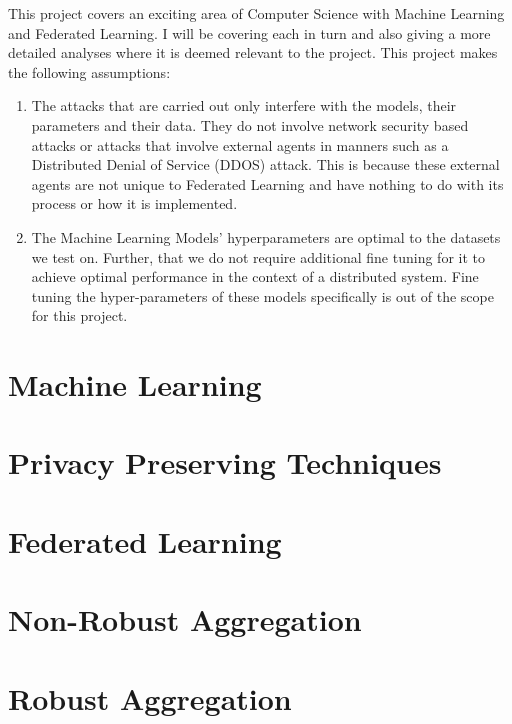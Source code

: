 This project covers an exciting area of Computer Science with Machine Learning and Federated Learning.
I will be covering each in turn and also giving a more detailed analyses where it is deemed relevant to the project.
This project makes the following assumptions:

\begin{enumerate}
    \item The attacks that are carried out only interfere with the models, their parameters and their data. They do not involve network security based attacks or attacks that involve external agents in manners such as a Distributed Denial of Service (DDOS) attack.
    This is because these external agents are not unique to Federated Learning and have nothing to do with its process or how it is implemented.
    
    \item The Machine Learning Models' hyperparameters are optimal to the datasets we test on. Further, that we do not require additional fine tuning for it to achieve optimal performance in the context of a distributed system. Fine tuning the hyper-parameters of these models specifically is out of the scope for this project.
\end{enumerate}


\section{Machine Learning}




\section{Privacy Preserving Techniques}




\section{Federated Learning}




\section{Non-Robust Aggregation}




\section{Robust Aggregation}



